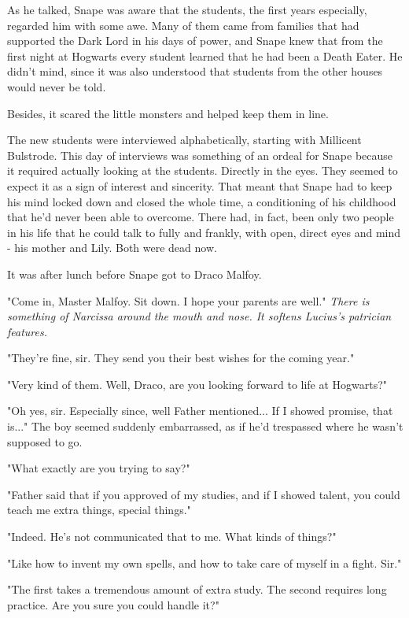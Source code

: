 \documentclass[a4paper,11pt]{article}
\begin{document}
As he talked, Snape was aware that the students, the first years especially, regarded him with some awe. Many of them came from families that had supported the Dark Lord in his days of power, and Snape knew that from the first night at Hogwarts every student learned that he had been a Death Eater. He didn't mind, since it was also understood that students from the other houses would never be told.

Besides, it scared the little monsters and helped keep them in line.

The new students were interviewed alphabetically, starting with Millicent Bulstrode. This day of interviews was something of an ordeal for Snape because it required actually looking at the students. Directly in the eyes. They seemed to expect it as a sign of interest and sincerity. That meant that Snape had to keep his mind locked down and closed the whole time, a conditioning of his childhood that he'd never been able to overcome. There had, in fact, been only two people in his life that he could talk to fully and frankly, with open, direct eyes and mind - his mother and Lily. Both were dead now.

It was after lunch before Snape got to Draco Malfoy.

"Come in, Master Malfoy. Sit down. I hope your parents are well." \emph{There is something of Narcissa around the mouth and nose. It softens Lucius's patrician features.}

"They're fine, sir. They send you their best wishes for the coming year."

"Very kind of them. Well, Draco, are you looking forward to life at Hogwarts?"

"Oh yes, sir. Especially since, well Father mentioned... If I showed promise, that is..." The boy seemed suddenly embarrassed, as if he'd trespassed where he wasn't supposed to go.

"What exactly are you trying to say?"

"Father said that if you approved of my studies, and if I showed talent, you could teach me extra things, special things."

"Indeed. He's not communicated that to me. What kinds of things?"

"Like how to invent my own spells, and how to take care of myself in a fight. Sir."

"The first takes a tremendous amount of extra study. The second requires long practice. Are you sure you could handle it?"
\end{document}
